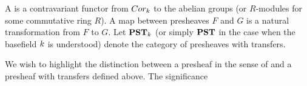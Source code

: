 \begin{defn}\label{def_pst}
A  is a contravariant functor from 
$Cor_k$ to the abelian groups (or $R$-modules for some 
commutative ring $R$). A map between presheaves $F$ and $G$ is a 
natural transformation from $F$ to $G$. Let $\mathbf{PST}_{k}$ (or
simply $\mathbf{PST}$ in the case when the basefield $k$ is 
understood) denote the category of presheaves with transfers.
\end{defn}

\begin{rmk}
We wish to highlight the distinction between a presheaf in the 
sense of \cite{Hart} and a presheaf with transfers defined above.
The significance
\end{rmk}
